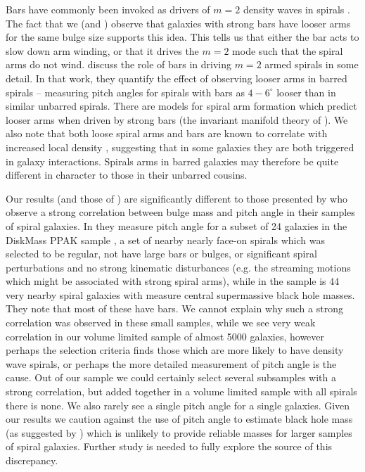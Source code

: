 \documentclass[usenatbib]{mn2e}
\begin{document}
 Bars have commonly been invoked as drivers of $m=2$ density waves in spirals \citep[e.g.][]{DobbsBaba2014,Hart2017b}. The fact that we (and \citealt{Hart2017b}) observe that galaxies with strong bars have looser arms for the same bulge size supports this idea. This tells us that either the bar acts to slow down arm winding, or that it drives the $m=2$ mode such that the spiral arms do not wind. \citet{Hart2017b} discuss the role of bars in driving $m=2$ armed spirals in some detail. In that work, they quantify the effect of observing looser arms in barred spirals -- measuring pitch angles for spirals with bars as $4-6^\circ$ looser than in similar unbarred spirals. There are models for spiral arm formation which predict looser arms when driven by strong bars (the invariant manifold theory of \citealt{Romero-Gomez2007}). We also note that both loose spiral arms and bars are known to correlate with increased local density \citep{Casteels2013}, suggesting that in some galaxies they are both triggered in galaxy interactions. Spirals arms in barred galaxies may therefore be quite different in character to those in their unbarred cousins. 
 
 Our results (and those of \citealt{Hart2017a,Hart2017b,Hart2018}) are significantly different to those presented by \citet{Davis2015,Davis2017} who observe a strong correlation between bulge mass and pitch angle in their samples of spiral galaxies. In \citet{Davis2015} they measure pitch angle for a subset of 24 galaxies in the DiskMass PPAK sample \citep{Bershady2010,Martinsson2013}, a set of nearby nearly face-on spirals which was selected to be regular, not have large bars or bulges, or significant spiral perturbations and no strong kinematic disturbances (e.g. the streaming motions which might be associated with strong spiral arms), while in \citet{Davis2017} the sample is 44 very nearby spiral galaxies with measure central supermassive black hole masses. They note that most of these have bars. We cannot explain why such a strong correlation was observed in these small samples, while we see very weak correlation in our volume limited sample of almost 5000 galaxies, however perhaps the selection criteria finds those which are more likely to have density wave spirals, or perhaps the more detailed measurement of pitch angle is the cause. Out of our sample we could certainly select several subsamples with a strong correlation, but added together in a volume limited sample with all spirals there is none. We also rarely see a single pitch angle for a single galaxies. Given our results we caution against the use of pitch angle to estimate black hole mass (as suggested by \citealt{Davis2017}) which is unlikely to provide reliable masses for larger samples of spiral galaxies. Further study is needed to fully explore the source of this discrepancy.
 
\end{document}
